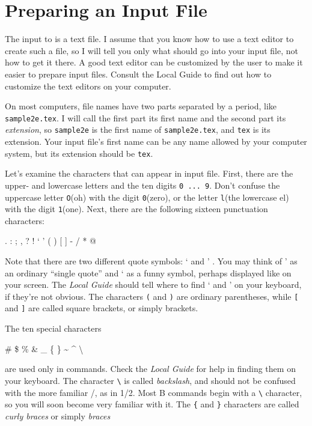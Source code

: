 \section{Preparing an Input File}
The input to \ltx{} is a text file. I assume that you know how to use a text
editor to create such a file, so I will tell you only what should go into your input
file, not how to get it there. A good text editor can be customized by the user
to make it easier to prepare \ltx{} input files. Consult the Local Guide to find
out how to customize the text editors on your computer.

On most computers, file names have two parts separated by a period, like
\texttt{sample2e.tex}. I will call the first part its first name and the second part 
its \textit{extension}, so \texttt{sample2e} is the first name of \texttt{sample2e.tex}, and 
\texttt{tex} is its extension. Your input file's first name can be any name allowed by your 
computer system, but its extension should be \texttt{tex}.

Let's examine the characters that can appear in input file. First, there
are the upper- and lowercase letters and the ten digits \texttt{0 ... 9}. Don't confuse
the uppercase letter \texttt{O}(oh) with the digit \texttt{0}(zero), or the letter \texttt{l}(the lowercase
el) with the digit \texttt{1}(one). Next, there are the following sixteen punctuation
characters:

\begin{center}
  \ttfamily
  . : ; , ? ! ` ' ( ) [ ] - / * @
\end{center}

Note that there are two different quote symbols: ` and ' . You may think of ' as
an ordinary ``single quote'' and ` as a funny symbol, perhaps displayed like \texttt{\textasciigrave} on
your screen. The \textit{Local Guide} should tell where to find ` and ' on your keyboard,
if they're not obvious. The characters \texttt{(} and \texttt{)} are ordinary parentheses, while
\texttt{[} and \texttt{]} are called square brackets, or simply brackets.

The ten special characters
\begin{center}
  \ttfamily
  \# \$ \% \& \_ \{ \} \~{} \^{} \textbackslash
\end{center}

are used only in \ltx{} commands. Check the \textit{Local Guide} for help in finding
them on your keyboard. The character \verb|\| is called \textit{backslash}, and should not
be confused with the more familiar /, as in 1/2. Most B\ltx{} commands begin
with a \verb|\| character, so you will soon become very familiar with it. The \verb|{| and \verb|}|
characters are called \textit{curly braces} or simply \textit{braces}